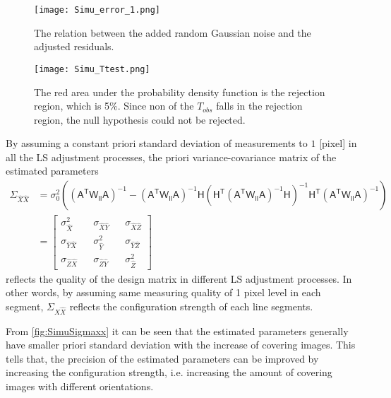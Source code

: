 
\begin{figure}
  \centering
  \texttt{[image: Simu\_error\_1.png]}
  \caption{\small The relation between the added random Gaussian noise and the adjusted residuals.}
  \label{fig:SimuError}
  \vspace{1cm}
  \centering
  \texttt{[image: Simu\_Ttest.png]}
  \caption{\small The red area under the probability density function is the rejection region, which is 5\%. Since non of the $T_{obs}$ falls in the rejection region, the null hypothesis could not be rejected.}
  \label{fig:SimuTtest}
\end{figure}

\clearpage


By assuming a constant priori standard deviation of measurements to $1$ [pixel] in all the LS adjustment processes, the priori variance-covariance matrix of the estimated parameters
\begin{equation}
\begin{split}
\Sigma_{\hat{X}\hat{X}}&=
\sigma_0^2
(
(\mathsf{A^TW_{ll}A})^{-1}
-
(\mathsf{A^TW_{ll}A})^{-1}
\mathsf{H}
(
\mathsf{H^T}
(\mathsf{A^TW_{ll}A})^{-1}
\mathsf{H}
)^{-1}
\mathsf{H^T}
(\mathsf{A^TW_{ll}A})^{-1}
)\\
&=
\begin{bmatrix}
\sigma_{\hat{X}}^2 && \sigma_{\hat{X}\hat{Y}} && \sigma_{\hat{X}\hat{Z}} \\
\sigma_{\hat{Y}\hat{X}} && \sigma_{\hat{Y}}^2 && \sigma_{\hat{Y}\hat{Z}} \\
\sigma_{\hat{Z}\hat{X}} && \sigma_{\hat{Z}\hat{Y}} && \sigma_{\hat{Z}}^2
\end{bmatrix}
\end{split}
\end{equation}
reflects the quality of the design matrix in different LS adjustment processes. In other words, by assuming same measuring quality of 1 pixel level in each segment, $\Sigma_{\hat{X}\hat{X}}$ reflects the configuration strength of each line segments.


From \cref{fig:SimuSigmaxx} it can be seen that the estimated parameters generally have smaller priori standard deviation %
with the increase of covering images. This tells that, {the precision of the estimated parameters can be improved by increasing the configuration strength, i.e. increasing the amount of covering images with different orientations}.

